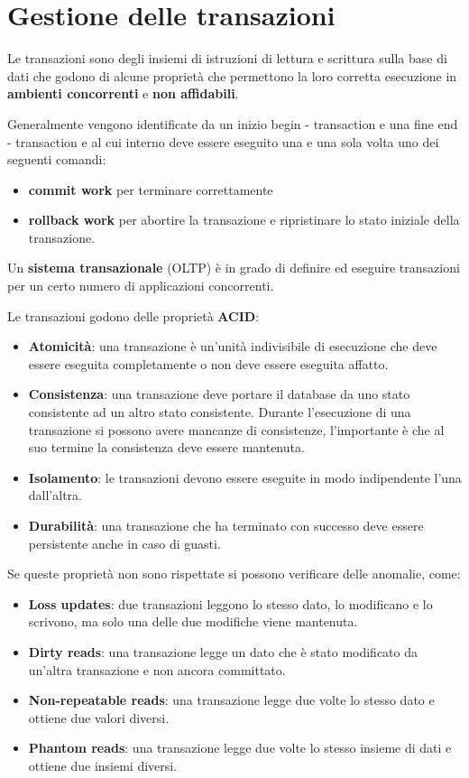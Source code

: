\section{Gestione delle transazioni}
Le transazioni sono degli insiemi di istruzioni di lettura e scrittura sulla base
di dati che godono di alcune proprietà che permettono la loro corretta esecuzione
in \textbf{ambienti concorrenti} e \textbf{non affidabili}.

Generalmente vengono identificate da un inizio begin - transaction e una fine
end - transaction e al cui interno deve essere eseguito una e una sola
volta uno dei seguenti comandi:
\begin{itemize}
    \item \textbf{commit work} per terminare correttamente
    \item \textbf{rollback work} per abortire la transazione e ripristinare lo stato
    iniziale della transazione.
\end{itemize}

Un \textbf{sistema transazionale} (OLTP) è in grado di definire ed eseguire
transazioni per un certo numero di applicazioni concorrenti.

Le transazioni godono delle proprietà \textbf{ACID}:
\begin{itemize}
    \item \textbf{Atomicità}: una transazione è un'unità indivisibile di
          esecuzione che deve essere eseguita completamente o non deve essere
          eseguita affatto.
    \item \textbf{Consistenza}: una transazione deve portare il database da uno
          stato consistente ad un altro stato consistente. Durante l'esecuzione 
          di una transazione si possono avere mancanze di consistenze, l'importante
          è che al suo termine la consistenza deve essere mantenuta.
    \item \textbf{Isolamento}: le transazioni devono essere eseguite in modo
          indipendente l'una dall'altra.
    \item \textbf{Durabilità}: una transazione che ha terminato con successo
          deve essere persistente anche in caso di guasti.
\end{itemize}
Se queste proprietà non sono rispettate si possono verificare delle anomalie,
come:
\begin{itemize}
    \item \textbf{Loss updates}: due transazioni leggono lo stesso
          dato, lo modificano e lo scrivono, ma solo una delle due modifiche
          viene mantenuta.
    \item \textbf{Dirty reads}: una transazione legge un dato che è stato
          modificato da un'altra transazione e non ancora committato.
    \item \textbf{Non-repeatable reads}: una transazione legge due
          volte lo stesso dato e ottiene due valori diversi.
    \item \textbf{Phantom reads}: una transazione legge due volte lo stesso
          insieme di dati e ottiene due insiemi diversi.
\end{itemize}


